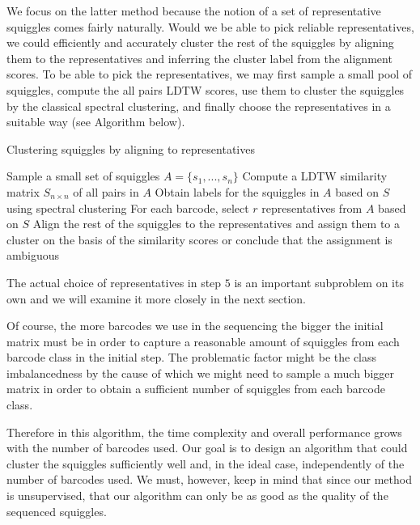 We focus on the latter method because the notion of a set of representative squiggles comes fairly naturally. Would we be able to pick reliable representatives, we could efficiently and accurately cluster the rest of the squiggles by aligning them to the representatives and inferring the cluster label from the alignment scores. To be able to pick the representatives, we may first sample a small pool of squiggles, compute the all pairs LDTW scores, use them to cluster the squiggles by the classical spectral clustering, and finally choose the representatives in a suitable way (see Algorithm below).

\begin{algorithm}[H]
\renewcommand{\thealgorithm}{}
\caption{Clustering squiggles by aligning to representatives}
\label{protocol1}
\begin{algorithmic}[1]
\STATE Sample a small set of squiggles $A = \{ s_1, ..., s_n \}$
\STATE Compute a LDTW similarity matrix $S_{n \times n}$ of all pairs in $A$
\STATE Obtain labels for the squiggles in $A$ based on $S$ using spectral clustering
\STATE For each barcode, select $r$ representatives from $A$ based on $S$
\STATE Align the rest of the squiggles to the representatives and assign them to a cluster on the basis of the similarity scores or conclude that the assignment is ambiguous
\end{algorithmic}
\end{algorithm}

The actual choice of representatives in step $5$ is an important subproblem on its own and we will examine it more closely in the next section.

Of course, the more barcodes we use in the sequencing the bigger the initial matrix must be in order to capture a reasonable amount of squiggles from each barcode class in the initial step. The problematic factor might be the class imbalancedness by the cause of which we might need to sample a much bigger matrix in order to obtain a sufficient number of squiggles from each barcode class.

Therefore in this algorithm, the time complexity  and overall performance grows with the number of barcodes used. Our goal is to design an algorithm that could cluster the squiggles sufficiently well and, in the ideal case, independently of the number of barcodes used. We must, however, keep in mind that since our method is unsupervised, that our algorithm can only be as good as the quality of the sequenced squiggles.


